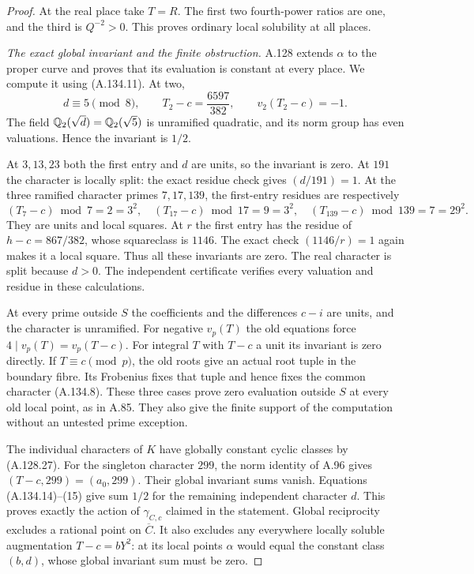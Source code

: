\begin{proof}
At the real place take $T=R$.
The first two fourth-power ratios are one, and
the third is $Q^{-2}>0$.
This proves ordinary local solubility at all places.

\emph{The exact global invariant and the finite obstruction.}
A.128 extends $\alpha$ to the proper curve and
proves that its evaluation is constant at every
place.
We compute it using (A.134.11).
At two,
\[
          d\equiv5\pmod8,\qquad
          T_2-c=\frac{6597}{382},\qquad v_2(T_2-c)=-1.
\tag{A.134.14}
\]
The field $\mathbb Q_2(\sqrt d)=\mathbb Q_2(\sqrt5)$ is
unramified quadratic, and its norm group has
even valuations.
Hence the invariant is $1/2$.

At $3,13,23$ both the first entry and $d$ are
units, so the invariant is zero.
At $191$ the character is locally split: the
exact residue check gives $(d/191)=1$.
At the three ramified character primes $7,17,139$,
the first-entry residues are respectively
\[
        (T_7-c)\bmod7=2=3^2,\quad
        (T_{17}-c)\bmod17=9=3^2,\quad
        (T_{139}-c)\bmod139=7=29^2.
\tag{A.134.15}
\]
They are units and local squares.
At $r$ the first entry has the residue of
$h-c=867/382$, whose squareclass is $1146$.
The exact check $(1146/r)=1$ again makes it a
local square.
Thus all these invariants are zero.
The real character is split because $d>0$.
The independent certificate verifies every
valuation and residue in these calculations.

At every prime outside $S$ the coefficients and
the differences $c-i$ are units, and the character
is unramified.
For negative $v_p(T)$ the old equations force
$4\mid v_p(T)=v_p(T-c)$.
For integral $T$ with $T-c$ a unit its invariant
is zero directly.
If $T\equiv c\pmod p$, the old roots give an
actual root tuple in the boundary fibre.
Its Frobenius fixes that tuple and hence fixes
the common character (A.134.8).
These three cases prove zero evaluation outside
$S$ at every old local point, as in A.85.
They also give the finite support of the computation
without an untested prime exception.

The individual characters of $K$ have globally
constant cyclic classes by (A.128.27).
For the singleton character $299$, the norm identity
of A.96 gives
$(T-c,299)=(a_0,299)$.
Their global invariant sums vanish.
Equations (A.134.14)--(15) give sum $1/2$ for
the remaining independent character $d$.
This proves exactly the action of $\gamma_{C,c}$
claimed in the statement.
Global reciprocity
\cite[Theorem 12.1.8]{AgentCTSkoro2019}
excludes a rational point on $\overline C$.
It also excludes any everywhere locally soluble
augmentation $T-c=bY^2$: at its local points
$\alpha$ would equal the constant class $(b,d)$,
whose global invariant sum must be zero.


\end{proof}
